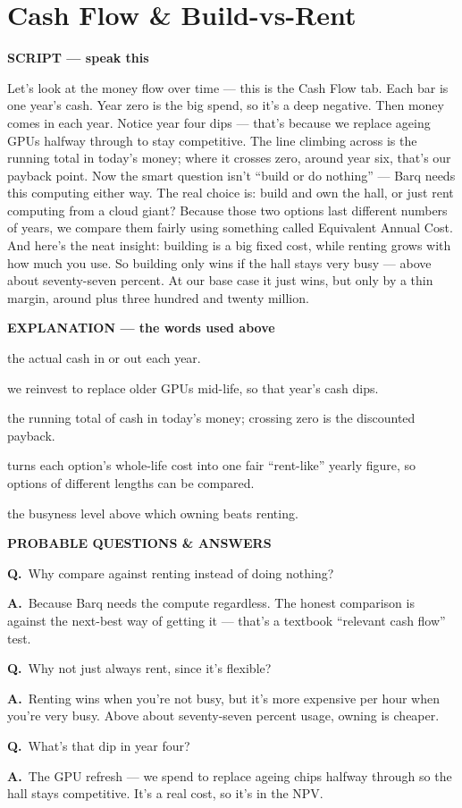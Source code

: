 \documentclass[12pt,a4paper]{article}
\newcommand{\block}[2]{\par\medskip\noindent\textcolor{#1}{\textbf{#2}}\par\nobreak\smallskip}
\newcommand{\SC}{\block{tvblue}{SCRIPT --- speak this}}
\newcommand{\EX}{\block{tvgreen}{EXPLANATION --- the words used above}}
\newcommand{\PQ}{\block{tvamber}{PROBABLE QUESTIONS \& ANSWERS}}
\newcommand{\qa}[2]{\par\noindent\textbf{Q.}~#1\par\noindent\textbf{A.}~#2\par\smallskip}
\newenvironment{terms}{\begin{description}[leftmargin=0pt,itemsep=2pt,font=\normalfont\bfseries]}{\end{description}}
\begin{document}
\section{Cash Flow \& Build-vs-Rent}

\SC
Let's look at the money flow over time --- this is the Cash Flow tab. Each bar is one year's cash. Year
zero is the big spend, so it's a deep negative. Then money comes in each year. Notice year four dips ---
that's because we replace ageing GPUs halfway through to stay competitive. The line climbing across is
the running total in today's money; where it crosses zero, around year six, that's our payback point.
Now the smart question isn't ``build or do nothing'' --- Barq needs this computing either way. The real
choice is: build and own the hall, or just rent computing from a cloud giant? Because those two options
last different numbers of years, we compare them fairly using something called Equivalent Annual Cost.
And here's the neat insight: building is a big fixed cost, while renting grows with how much you use.
So building only wins if the hall stays very busy --- above about seventy-seven percent. At our base
case it just wins, but only by a thin margin, around plus three hundred and twenty million.

\EX
\begin{terms}
  \item[Free cash flow (the bars):] the actual cash in or out each year.
  \item[Year-4 refresh:] we reinvest to replace older GPUs mid-life, so that year's cash dips.
  \item[Cumulative discounted line:] the running total of cash in today's money; crossing zero is the
  discounted payback.
  \item[EAC (Equivalent Annual Cost):] turns each option's whole-life cost into one fair ``rent-like''
  yearly figure, so options of different lengths can be compared.
  \item[Build-vs-rent crossover (\textasciitilde 77\%):] the busyness level above which owning beats
  renting.
\end{terms}

\PQ
\qa{Why compare against renting instead of doing nothing?}{Because Barq needs the compute regardless.
The honest comparison is against the next-best way of getting it --- that's a textbook ``relevant cash
flow'' test.}
\qa{Why not just always rent, since it's flexible?}{Renting wins when you're not busy, but it's more
expensive per hour when you're very busy. Above about seventy-seven percent usage, owning is cheaper.}
\qa{What's that dip in year four?}{The GPU refresh --- we spend to replace ageing chips halfway through
so the hall stays competitive. It's a real cost, so it's in the NPV.}
\end{document}
